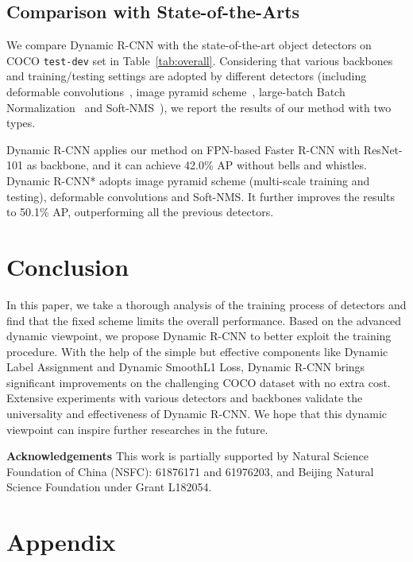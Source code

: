 \documentclass[runningheads]{llncs}
\begin{document}
\subsection{Comparison with State-of-the-Arts}

We compare Dynamic R-CNN with the state-of-the-art object detectors on COCO \texttt{test-dev} set in Table~\ref{tab:overall}. Considering that various backbones and training/testing settings are adopted by different detectors (including deformable convolutions~\cite{DCN,DCNv2}, image pyramid scheme~\cite{SNIP}, large-batch Batch Normalization~\cite{MegDet} and Soft-NMS~\cite{Soft-NMS}), we report the results of our method with two types.

Dynamic R-CNN applies our method on FPN-based Faster R-CNN with ResNet-101 as backbone, and it can achieve 42.0\% AP without bells and whistles. Dynamic R-CNN* adopts image pyramid scheme (multi-scale training and testing), deformable convolutions and Soft-NMS. It further improves the results to 50.1\% AP, outperforming all the previous detectors.


\section{Conclusion}

In this paper, we take a thorough analysis of the training process of detectors and find that the fixed scheme limits the overall performance. Based on the advanced dynamic viewpoint, we propose Dynamic R-CNN to better exploit the training procedure. With the help of the simple but effective components like Dynamic Label Assignment and Dynamic SmoothL1 Loss, Dynamic R-CNN brings significant improvements on the challenging COCO dataset with no extra cost. Extensive experiments with various detectors and backbones validate the universality and effectiveness of Dynamic R-CNN. We hope that this dynamic viewpoint can inspire further researches in the future.


\noindent
\textbf{Acknowledgements} This work is partially supported by Natural Science Foundation of China (NSFC): 61876171 and 61976203, and Beijing Natural Science Foundation under Grant L182054.




\clearpage

\section{Appendix}
\end{document}
